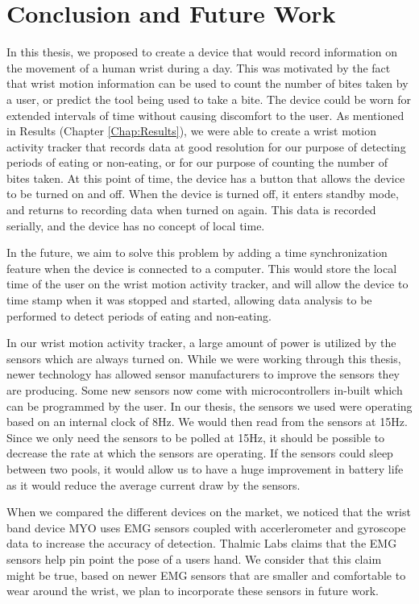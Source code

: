 \chapter{Conclusion and Future Work}
\label{Chap:Concl}
In this thesis, we proposed to create a device that would record information on 
the movement of a human wrist during a day.
This was motivated by the fact that wrist motion information can be used to count the number of bites
taken by a user,
or predict the tool being used to take a bite.
The device could be worn for extended intervals of time
without causing discomfort to the user.
As mentioned in Results (Chapter \ref{Chap:Results}),
we were able to create a wrist motion activity tracker that records data at good resolution
for our purpose of detecting periods of eating or non-eating, 
or for our purpose of counting the number of bites taken.
At this point of time,
the device has a button that allows the device to be turned on and off.
When the device is turned off,
it enters standby mode,
and returns to recording data when turned on again.
This data is recorded serially,
and the device has no concept of local time.

In the future,
we aim to solve this problem by adding a time synchronization feature when the device is connected to a computer.
This would store the local time of the user on the wrist motion activity tracker,
and will allow the device to time stamp when it was stopped and started,
allowing data analysis to be performed to detect periods of eating and non-eating.

In our wrist motion activity tracker,
a large amount of power is utilized by the sensors which are always turned on.
While we were working through this thesis,
newer technology has allowed sensor manufacturers to improve the sensors they are producing.
Some new sensors now come with microcontrollers in-built which can be programmed by the user.
In our thesis,
the sensors we used
were operating based on an internal clock of 8Hz.
We would then read from the sensors at 15Hz.
Since we only need the sensors to be polled at 15Hz,
it should be possible to decrease the rate at which the sensors are operating.
If the sensors could sleep between two pools,
it would allow us to have a huge improvement in battery life as it would reduce the average current draw by the sensors.

When we compared the different devices on the market,
we noticed that the wrist band device MYO uses EMG sensors coupled with accerlerometer and gyroscope data to increase the accuracy of detection.
Thalmic Labs \cite{Web:GetMyo} claims that the EMG sensors help pin point the pose of a users hand.
We consider that this claim might be true,
based on newer EMG sensors that are smaller and comfortable to wear around the wrist,
we plan to incorporate these sensors in future work.